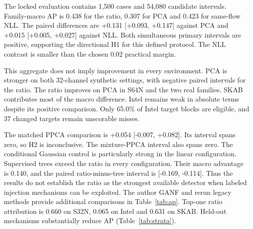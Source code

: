 The locked evaluation contains 1,500 cases and 54,080 candidate intervals. Family-macro AP is 0.438 for the ratio, 0.307 for PCA and 0.423 for same-flow NLL. The paired differences are +0.131 [+0.093, +0.147] against PCA and +0.015 [+0.005, +0.027] against NLL. Both simultaneous primary intervals are positive, supporting the directional H1 for this defined protocol. The NLL contrast is smaller than the chosen 0.02 practical margin.

This aggregate does not imply improvement in every environment. PCA is stronger on both 32-channel synthetic settings, with negative paired intervals for the ratio. The ratio improves on PCA in S64N and the two real families. SKAB contributes most of the macro difference. Intel remains weak in absolute terms despite its positive comparison. Only 65.0\% of Intel target blocks are eligible, and 37 changed targets remain unscorable misses.

The matched PPCA comparison is +0.054 [-0.007, +0.082]. Its interval spans zero, so H2 is inconclusive. The mixture-PPCA interval also spans zero. The conditional Gaussian control is particularly strong in the linear configuration. Supervised trees exceed the ratio in every configuration. Their macro advantage is 0.140, and the paired ratio-minus-tree interval is [-0.169, -0.114]. Thus the results do not establish the ratio as the strongest available detector when labeled injection mechanisms can be exploited. The author GANF and rerun legacy methods provide additional comparisons in Table~\ref{tab:ap}. Top-one ratio attribution is 0.660 on S32N, 0.065 on Intel and 0.631 on SKAB. Held-out mechanisms substantially reduce AP (Table~\ref{tab:strata}).
